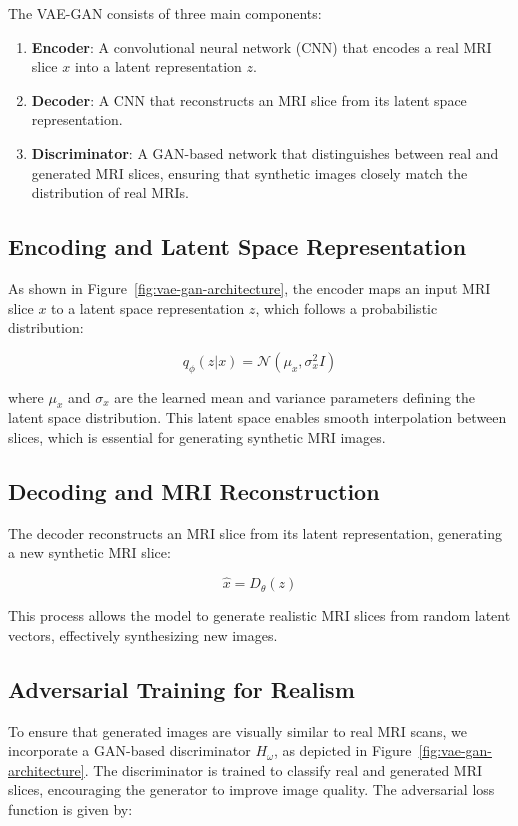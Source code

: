 \documentclass[a4paper,12pt]{article}
\begin{document}
The VAE-GAN consists of three main components:
\begin{enumerate}
    \item \textbf{Encoder}: A convolutional neural network (CNN) that encodes a real MRI slice \( x \) into a latent representation \( z \).
    \item \textbf{Decoder}: A CNN that reconstructs an MRI slice from its latent space representation.
    \item \textbf{Discriminator}: A GAN-based network that distinguishes between real and generated MRI slices, ensuring that synthetic images closely match the distribution of real MRIs.
\end{enumerate}

\subsection{Encoding and Latent Space Representation}
As shown in Figure~\ref{fig:vae-gan-architecture}, the encoder maps an input MRI slice \( x \) to a latent space representation \( z \), which follows a probabilistic distribution:

\[
    q_{\phi}(z|x) = \mathcal{N}(\mu_x, \sigma_x^2 I)
\]

where \( \mu_x \) and \( \sigma_x \) are the learned mean and variance parameters defining the latent space distribution. This latent space enables smooth interpolation between slices, which is essential for generating synthetic MRI images.

\subsection{Decoding and MRI Reconstruction}
The decoder reconstructs an MRI slice from its latent representation, generating a new synthetic MRI slice:

\[
    \hat{x} = D_{\theta}(z)
\]

This process allows the model to generate realistic MRI slices from random latent vectors, effectively synthesizing new images.

\subsection{Adversarial Training for Realism}
To ensure that generated images are visually similar to real MRI scans, we incorporate a GAN-based discriminator \( H_{\omega} \), as depicted in Figure~\ref{fig:vae-gan-architecture}. The discriminator is trained to classify real and generated MRI slices, encouraging the generator to improve image quality. The adversarial loss function is given by:
\end{document}
